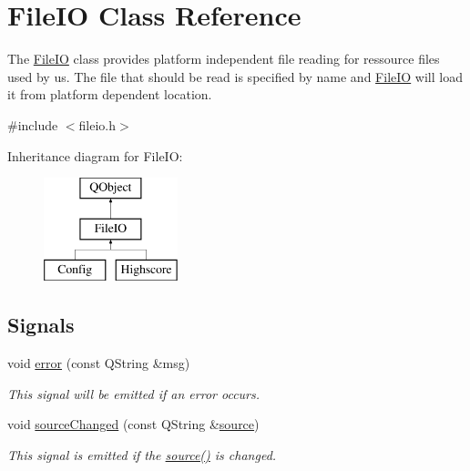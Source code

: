 \hypertarget{class_file_i_o}{}\section{File\+I\+O Class Reference}
\label{class_file_i_o}


The \hyperlink{class_file_i_o}{File\+I\+O} class provides platform independent file reading for ressource files used by us.  The file that should be read is specified by name and \hyperlink{class_file_i_o}{File\+I\+O} will load it from platform dependent location.  




{\ttfamily \#include $<$fileio.\+h$>$}

Inheritance diagram for File\+I\+O\+:\begin{figure}[H]
\begin{center}
\leavevmode
\includegraphics[height=3.000000cm]{class_file_i_o}
\end{center}
\end{figure}
\subsection*{Signals}
\begin{DoxyCompactItemize}
\item 
void \hyperlink{class_file_i_o_a4136bb085d530f9dd54eb849f14d58da}{error} (const Q\+String \&msg)
\begin{DoxyCompactList}\small\item\em This signal will be emitted if an error occurs. \end{DoxyCompactList}\item 
void \hyperlink{class_file_i_o_a31a6e00e907268e4473a0a826d2e6a1e}{source\+Changed} (const Q\+String \&\hyperlink{class_file_i_o_ad4467aa6c50748ac1e7076d25dcd33cc}{source})
\begin{DoxyCompactList}\small\item\em This signal is emitted if the \hyperlink{class_file_i_o_a8da2b4c6cd72af512e4556203c1c66e7}{source()} is changed. \end{DoxyCompactList}\end{DoxyCompactItemize}
